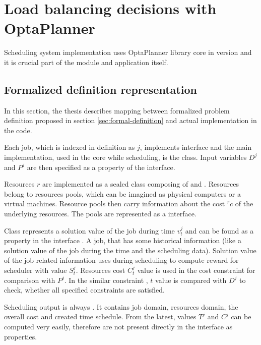 \section{Load balancing decisions with OptaPlanner}\label{sec:load-balancing-optaplanner}

Scheduling system implementation uses OptaPlanner library core in version \cite{optaplannerDoc}
and it is crucial part of the  module and application itself.

\subsection{Formalized definition representation}\label{subsec:formalized-definition-representation}
In this section,
the thesis describes mapping between formalized problem definition proposed in section \ref{sec:formal-definition}
and actual implementation in the code.

Each job, which is indexed in definition as $j$,
implements  interface 
and the main implementation, used in the core while scheduling, is the  class.
Input variables $D^{j}$ and $P^{j}$ are then specified as a  property of the  interface.

Resources $r$ are implemented as a sealed class  composing of  
and .
Resources belong to resources pools,
which can be imagined as physical computers or a virtual machines.
Resource pools then carry information about the cost ${}^{r}c$ of the underlying resources.
The pools are represented as a  interface.

Class  represents a solution value of the job during time $v_{t}^{j}$
and can be found as a property in the interface .
A job, 
that has some historical information (like a solution value of the job during the time and the scheduling data).
Solution value of the job related information uses  during scheduling to compute reward for scheduler with value $S_{t}^{j}$.
Resources cost $C_{t}^{j}$ value is used in the cost constraint  for comparison with $P^{j}$.
In the similar constraint , $t$ value is compared with $D^{j}$ to check,
whether all specified constraints are satisfied.

Scheduling output is always .
It contains job domain, resources domain, the overall cost
and created time schedule.
From the latest, 
values $T^{j}$ and $C^{j}$ can be computed very easily,
therefore are not present directly in the interface as properties.

